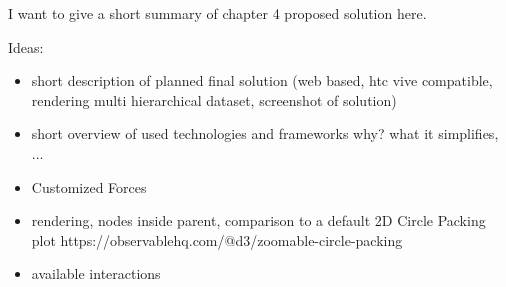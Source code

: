 I want to give a short summary of chapter 4 proposed solution here. 

Ideas:
\begin{itemize}
    \item short description of planned final solution (web based, htc vive compatible, rendering multi hierarchical dataset, screenshot of solution)  
    \item short overview of used technologies and frameworks why? what it simplifies, ... 
    \item Customized Forces
    \item rendering, nodes inside parent, comparison to a default 2D Circle Packing plot https://observablehq.com/@d3/zoomable-circle-packing 
    \item available interactions
\end{itemize}